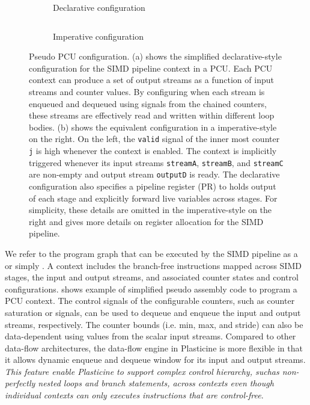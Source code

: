 \begin{figure}
  \begin{subfigure}[b]{0.5\textwidth}
    \inputminted{python}{code/contextfull.py}
    \caption{Declarative configuration}
    \label{fig:contexta}
  \end{subfigure}
  \hfill
  \begin{subfigure}[b]{0.4\textwidth}
    \inputminted{python}{code/context.py}
    \caption{Imperative configuration}
    \label{fig:contextb}
  \end{subfigure}
  \caption[Example PCU configuration]{
    Pseudo PCU configuration.
    (a) shows the simplified declarative-style configuration for the SIMD pipeline context in a PCU.
    Each PCU context can produce a set of output streams as a function of input streams and counter
    values.
    By configuring when each stream is enqueued and dequeued using signals from the chained counters, 
    these streams are effectively read and written within different loop bodies.
    (b) shows the equivalent configuration in a imperative-style on the right.
    On the left, the \texttt{valid} signal of the inner most counter \texttt{j} is high whenever the context is
    enabled. The context is implicitly triggered whenever its input streams \texttt{streamA},
    \texttt{streamB}, and \texttt{streamC} are non-empty and output stream \texttt{outputD} is ready.
    The declarative configuration also specifies a pipeline register (PR) to holds output of each stage
    and explicitly forward live variables across stages. 
    For simplicity, these details are omitted in the imperative-style on the right and
     gives more details on register allocation for the SIMD pipeline.
  }
  \label{fig:context}
\end{figure}

We refer to the program graph that can be executed by the SIMD pipeline as a  or
simply . 
A context includes the branch-free instructions mapped across SIMD stages, the input and output 
streams, and associated counter states and control configurations.
 shows example of simplified pseudo assembly code to program a PCU context.
The control signals of the configurable counters, such as counter saturation or 
signals, can be used to dequeue and enqueue the input and output streams, respectively.
The counter bounds (i.e. min, max, and stride) can also be data-dependent using values from the 
scalar input streams. Compared to other data-flow architectures, the data-flow engine in Plasticine 
is more flexible in that it allows dynamic enqueue and dequeue window for its input and output streams.
\emph{This feature enable Plasticine to support complex control hierarchy, suchas  non-perfectly nested loops and
branch statements, across contexts even though individual contexts can only executes instructions that are
control-free}. 

